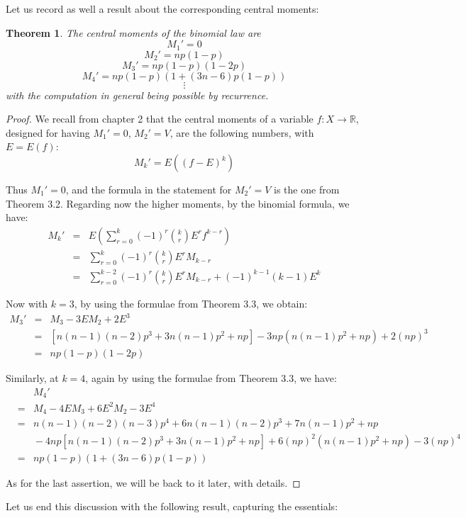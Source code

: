\documentclass[12pt]{amsbook}
\newtheorem{theorem}{Theorem}[chapter]
\begin{document}
Let us record as well a result about the corresponding central moments:


\begin{theorem}
The central moments of the binomial law are
$$M_1'=0$$
$$M_2'=np(1-p)$$
$$M_3'=np(1-p)(1-2p)$$
$$M_4'=np(1-p)(1+(3n-6)p(1-p))$$
$$\vdots$$
with the computation in general being possible by recurrence.
\end{theorem}

\begin{proof}
We recall from chapter 2 that the central moments of a variable $f:X\to\mathbb R$, designed for having $M_1'=0$, $M_2'=V$, are the following numbers, with $E=E(f)$:
$$M_k'=E((f-E)^k)$$

Thus $M_1'=0$, and the formula in the statement for $M_2'=V$ is the one from Theorem 3.2. Regarding now the higher moments, by the binomial formula, we have:
\begin{eqnarray*}
M_k'
&=&E\left(\sum_{r=0}^k(-1)^r\binom{k}{r}E^rf^{k-r}\right)\\
&=&\sum_{r=0}^k(-1)^r\binom{k}{r}E^rM_{k-r}\\
&=&\sum_{r=0}^{k-2}(-1)^r\binom{k}{r}E^rM_{k-r}+(-1)^{k-1}(k-1)E^k
\end{eqnarray*}

Now with $k=3$, by using the formulae from Theorem 3.3, we obtain:
\begin{eqnarray*}
M_3'
&=&M_3-3EM_2+2E^3\\
&=&[n(n-1)(n-2)p^3+3n(n-1)p^2+np]-3np(n(n-1)p^2+np)+2(np)^3\\
&=&np(1-p)(1-2p)
\end{eqnarray*}

Similarly, at $k=4$, again by using the formulae from Theorem 3.3, we have:
\begin{eqnarray*}
&&M_4'\\
&=&M_4-4EM_3+6E^2M_2-3E^4\\
&=&n(n-1)(n-2)(n-3)p^4+6n(n-1)(n-2)p^3+7n(n-1)p^2+np\\
&&\!\!-4np[n(n-1)(n-2)p^3+3n(n-1)p^2+np]+6(np)^2(n(n-1)p^2+np)-3(np)^4\\
&=&np(1-p)(1+(3n-6)p(1-p))
\end{eqnarray*}

As for the last assertion, we will be back to it later, with details.
\end{proof}

Let us end this discussion with the following result, capturing the essentials:
\end{document}
